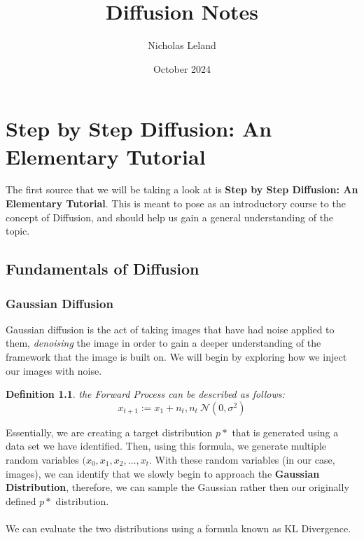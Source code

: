 \documentclass[10pt, oneside]{report}
\title{Diffusion Notes}
\author{Nicholas Leland}
\date{October 2024}
\newtheorem{defn}{Definition}
\begin{document}
\maketitle
\tableofcontents

\vspace{.25in}

\chapter{Step by Step Diffusion: An Elementary Tutorial}
The first source that we will be taking a look at is \textbf{Step by Step Diffusion: An Elementary Tutorial}.  This is meant to pose as an introductory course to the concept of Diffusion, and should help us gain a general understanding of the topic.  

\section{Fundamentals of Diffusion}

\subsection{Gaussian Diffusion}

Gaussian diffusion is the act of taking images that have had noise applied to them, \textit{denoising} the image in order to gain a deeper understanding of the framework that the image is built on. 
We will begin by exploring how we inject our images with noise.  

\begin{defn}
    the {\em Forward Process} can be described as follows: 
    \[
        x_{t+1} := x_1 + n_t,   n_t ~ \mathscr{N}(0, \sigma^2)
    \] 
\end{defn}

Essentially, we are creating a target distribution $p*$ that is generated using a data set we have identified.  Then, using this formula, we generate multiple random variables $(x_0, x_1, x_2, \ldots, x_t$.  With these random variables (in our case, images), we can identify that we slowly begin to approach the \textbf{Gaussian Distribution}, therefore, we can sample the Gaussian rather then our originally defined $p*$ distribution.
\\
\\

We can evaluate the two distributions using a formula known as KL Divergence.
\end{document}
